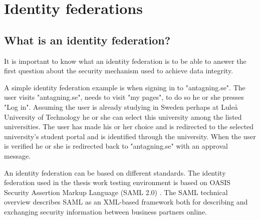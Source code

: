 \section{Identity federations}
\subsection{What is an identity federation?}
It is important to know what an identity federation is to be able to answer the first question about the security mechanism used to achieve data integrity. 

A simple identity federation example is when signing in to "antagning.se". 
The user visits "antagning.se", needs to visit "my pages", to do so he or she presses "Log in". 
Assuming the user is already studying in Sweden perhaps at Lule\r{a} University of Technology he or she 
can select this university among the listed universities. 
The user has made his or her choice and is redirected to the selected university's student portal and is identified through the university.
When the user is verified he or she is redirected back to "antagning.se" with an approval message.

An identity federation can be based on different standards.
The identity federation used in the thesis work testing environment is based on OASIS Security Assertion Markup Language (SAML 2.0) \cite{pdf:oasis-open-core,pdf:oasis-open-metadata,pdf:oasis-open-metadata-profile,pdf:oasis-open-bindings,pdf:oasis-open-profiles,pdf:oasis-open-glossary,pdf:oasis-open}. 
The SAML technical overview \cite[p.~8]{pdf:oasis-open} describes SAML as an XML-based framework both for
describing and exchanging security information between business partners online.    

